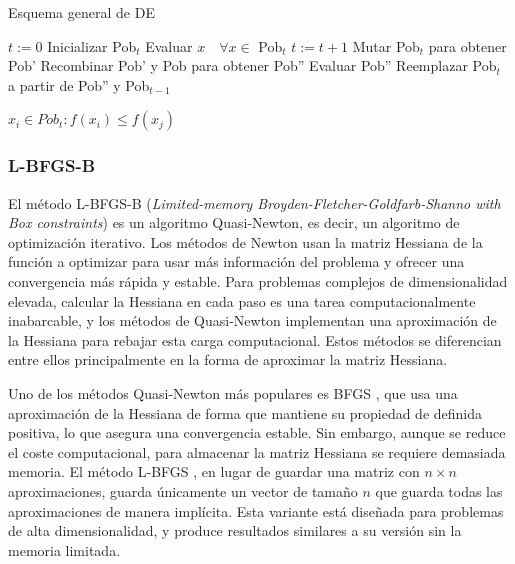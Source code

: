 \begin{algorithm}
\caption{Esquema general de DE}
\label{alg:de}
	\begin{algorithmic}
		\State $t:=0$
		\State Inicializar Pob$_t$
		\State Evaluar $x \quad \forall x \in$ Pob$_t$
			\State $t:=t+1$			
			\State Mutar Pob$_t$ para obtener Pob'
			\State Recombinar Pob' y Pob para obtener Pob'' 
			\State Evaluar Pob''			
			\State Reemplazar Pob$_t$ a partir de Pob'' y Pob$_{t-1}$
		\EndWhile
		
		
		\Return $x_i \in Pob_t : f(x_i)\leq f(x_j)$
	\end{algorithmic}
\end{algorithm}		
		
	

\subsubsection{L-BFGS-B}\label{sec:l-bfgs}


El método L-BFGS-B (\textit{Limited-memory Broyden-Fletcher-Goldfarb-Shanno with Box constraints}) \cite{L-BFGS-B} es un algoritmo Quasi-Newton, es decir, un algoritmo de optimización iterativo. Los métodos de Newton usan la matriz Hessiana de la función a optimizar para usar más información del problema y ofrecer una convergencia más rápida y estable. Para problemas complejos de  dimensionalidad elevada, calcular la Hessiana en cada paso es una tarea computacionalmente inabarcable, y los métodos de Quasi-Newton implementan una aproximación de la Hessiana para rebajar esta carga computacional. Estos métodos se diferencian entre ellos principalmente en la forma de aproximar la matriz Hessiana.

Uno de los métodos Quasi-Newton más populares es BFGS \cite{BFGS}, que usa una aproximación de la Hessiana de forma que mantiene su propiedad de definida positiva, lo que asegura una convergencia estable. Sin embargo, aunque se reduce el coste computacional, para almacenar la matriz Hessiana se requiere demasiada memoria. El método L-BFGS \cite{L-BFGS}, en lugar de guardar una matriz con $n \times n$ aproximaciones, guarda únicamente un vector de tamaño $n$ que guarda todas las aproximaciones de manera implícita. Esta variante está diseñada para problemas de alta dimensionalidad, y produce resultados similares a su versión sin la memoria limitada.

